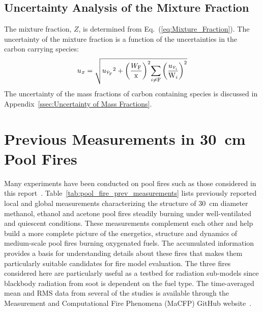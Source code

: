 \documentclass[12pt]{article}
\begin{document}
\subsection{Uncertainty Analysis of the Mixture Fraction}\label{sec:Uncertainty_Mix_Frac}

The mixture fraction, $Z$, is determined from Eq.~(\ref{eq:Mixture_Fraction}). The uncertainty of the mixture fraction is a function of the uncertainties in the carbon carrying species:
\begin{equation}
\label{eq:mixture_frac_uncertainty}
u_{\scriptscriptstyle Z}=\sqrt{{u_{\scriptscriptstyle \bar{Y}_{\rm F}}}^2+{\left(\frac{W_{\rm F}}{\rm x}\right)}^2{\sum_{i\ne {\rm F}}{\left(\frac{u_{\scriptscriptstyle \bar{Y}_{i}}}{\textrm{W}_{i}} \right)}^2}}
\end{equation}
The uncertainty of the mass fractions of carbon containing species is discussed in Appendix~\ref{ssec:Uncertainty of Mass Fractions}.

\pagebreak

\section{Previous Measurements in 30~cm Pool Fires}
Many experiments have been conducted on pool fires such as those considered in this report~\cite{Weckman1996,Kim2019,Hamins1994, Klassen1994,Hamins1991,Hamins2016,Wang2019,Buch1997,Hogben1998,Weckman1989,Corlett1966,Sung2019}. Table~\ref{tab:pool_fire_prev_measurements} lists previously reported local and global measurements characterizing the structure of 30~cm diameter methanol, ethanol and acetone pool fires steadily burning under well-ventilated and quiescent conditions. These measurements complement each other and help build a more complete picture of the energetics, structure and dynamics of medium-scale pool fires burning oxygenated fuels. The accumulated information provides a basis for understanding details about these fires that makes them particularly suitable candidates for fire model evaluation. The three fires considered here are particularly useful as a testbed for radiation sub-models since blackbody radiation from soot is dependent on the fuel type. The time-averaged mean and RMS data from several of the studies is available through the Measurement and Computational Fire Phenomena (MaCFP) GitHub website~\cite{MaCFp}.
\end{document}
